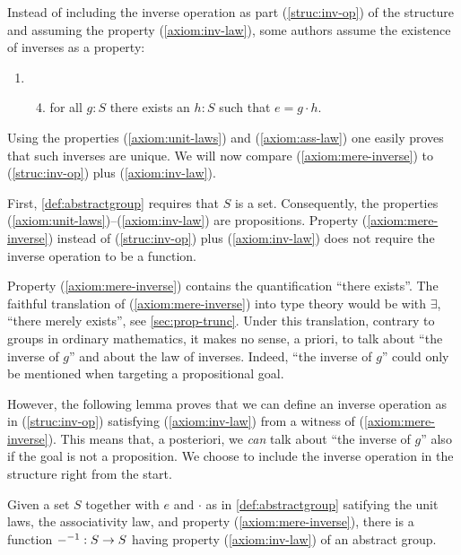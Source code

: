 \begin{remark}\label{rem:inverses-as-property}
  \makeatletter %
  \renewcommand\p@enumii{}%
  \makeatother%
  Instead of including the inverse operation as part
  (\ref{struc:inv-op}) of the structure and assuming the property
  (\ref{axiom:inv-law}), some authors assume the existence of inverses
  as a property:
  \begin{enumerate}
  \item[]\begin{enumerate}\setcounter{enumii}{3}%
    \item\label{axiom:mere-inverse} for all $g:S$ there exists an
      $h:S$ such that $e = g \cdot h$.
    \end{enumerate}
  \end{enumerate}
  Using the properties (\ref{axiom:unit-laws}) and
  (\ref{axiom:ass-law}) one easily proves that such inverses are
  unique. We will now compare (\ref{axiom:mere-inverse}) to (\ref{struc:inv-op}) plus
  (\ref{axiom:inv-law}).

  First, \cref{def:abstractgroup} requires that $S$ is a set.
  Consequently, the properties
  (\ref{axiom:unit-laws})--(\ref{axiom:inv-law}) are propositions.
  Property (\ref{axiom:mere-inverse}) instead of (\ref{struc:inv-op}) plus
  (\ref{axiom:inv-law}) does not require the inverse operation to be a
  function.

  Property (\ref{axiom:mere-inverse}) contains the quantification
  ``there exists''.  The faithful translation of
  (\ref{axiom:mere-inverse}) into type theory would be with $\exists$,
  ``there merely exists'', see \cref{sec:prop-trunc}.  Under this
  translation, contrary to groups in ordinary mathematics, it makes no
  sense, a priori, to talk about ``the inverse of $g$'' and about the
  law of inverses.  Indeed, ``the inverse of $g$'' could only be
  mentioned when targeting a propositional goal.

  However, the following lemma proves that we can define an inverse
  operation as in (\ref{struc:inv-op}) satisfying
  (\ref{axiom:inv-law}) from a witness of (\ref{axiom:mere-inverse}).
  This means that, a posteriori, we \emph{can} talk about ``the
  inverse of $g$'' also if the goal is not a proposition.  We choose
  to include the inverse operation in the structure right from the
  start.
\end{remark} 

\begin{lemma}%
  \label{lem:group-inv-operation}%
  Given a set $S$ together with $e$ and $\cdot$ as in
  \cref{def:abstractgroup} satifying the unit laws, the associativity
  law, and property (\ref{axiom:mere-inverse}), there is a function
  ${-}^{-1}: S \to S$ having property (\ref{axiom:inv-law}) of an
  abstract group.
\end{lemma}


